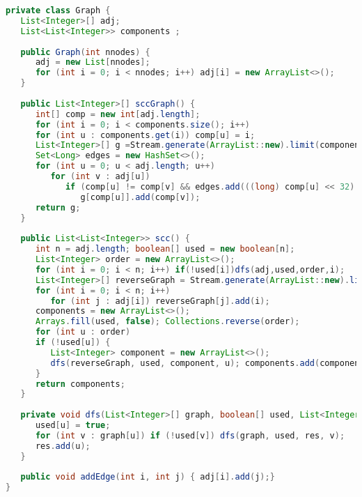 \begin{lstlisting}[language=Java]
private class Graph {
   List<Integer>[] adj;
   List<List<Integer>> components ;
   
   public Graph(int nnodes) {
      adj = new List[nnodes];
      for (int i = 0; i < nnodes; i++) adj[i] = new ArrayList<>();
   }
	
   public List<Integer>[] sccGraph() {
      int[] comp = new int[adj.length];
      for (int i = 0; i < components.size(); i++)
      for (int u : components.get(i)) comp[u] = i;
      List<Integer>[] g =Stream.generate(ArrayList::new).limit(components.size()).toArray(List[]::new);
      Set<Long> edges = new HashSet<>();
      for (int u = 0; u < adj.length; u++)
         for (int v : adj[u])
            if (comp[u] != comp[v] && edges.add(((long) comp[u] << 32) + comp[v]))
               g[comp[u]].add(comp[v]);
      return g;
   }
	
   public List<List<Integer>> scc() {
      int n = adj.length; boolean[] used = new boolean[n];
      List<Integer> order = new ArrayList<>();
      for (int i = 0; i < n; i++) if(!used[i])dfs(adj,used,order,i);
      List<Integer>[] reverseGraph = Stream.generate(ArrayList::new).limit(n).toArray(List[]::new);
      for (int i = 0; i < n; i++)
         for (int j : adj[i]) reverseGraph[j].add(i);
      components = new ArrayList<>();
      Arrays.fill(used, false); Collections.reverse(order);
      for (int u : order)
      if (!used[u]) {
         List<Integer> component = new ArrayList<>();
         dfs(reverseGraph, used, component, u); components.add(component);
      }
      return components;
   }
	
   private void dfs(List<Integer>[] graph, boolean[] used, List<Integer> res, int u) {
      used[u] = true;
      for (int v : graph[u]) if (!used[v]) dfs(graph, used, res, v);
      res.add(u);
   }
	
   public void addEdge(int i, int j) { adj[i].add(j);}
}
\end{lstlisting}